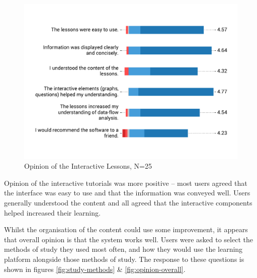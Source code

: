 \documentclass[bsc,twoside,singlespacing,parskip,logo,notimes,normalheadings]{infthesis}
\begin{document}
    \begin{figure}[!htb]
      \centering
      \captionsetup{width=\textwidth, justification=centering}
      \caption{Opinion of the Interactive Lessons, N=25}\label{fig:opinion-lessons}
      \includegraphics[width=\textwidth, trim=0 50 0 50, clip]{img/lesson_opinion.pdf}
    \end{figure}

    Opinion of the interactive tutorials was more positive -- most
    users agreed that the interface was easy to use and that the
    information was conveyed well. Users generally understood the
    content and all agreed that the interactive components helped
    increased their learning.

    Whilst the organisation of the content could use some improvement,
    it appears that overall opinion is that the system works
    well. Users were asked to select the methods of study they used
    most often, and how they would use the learning platform alongside
    those methods of study. The response to these questions is shown
    in figures \ref{fig:study-methods} \& \ref{fig:opinion-overall}.
\end{document}
